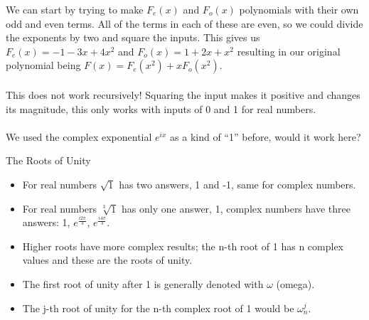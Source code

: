 \documentclass{beamer}
\begin{document}
\begin{frame}
  We can start by trying to make $F_e(x)$ and $F_o(x)$ polynomials with their own odd and even terms. All of the terms in each of these are even, so we could divide the exponents by two and square the inputs. This gives us $F_e(x)=-1-3x+4x^2$ and $F_o(x)=1+2x+x^2$ resulting in our original polynomial being $F(x) = F_e(x^2) + x F_o(x^2)$.\\~\\

  This does not work recursively! Squaring the input makes it positive and changes its magnitude, this only works with inputs of 0 and 1 for real numbers.\\~\\

  We used the complex exponential $e^{ix}$ as a kind of ``1'' before, would it work here?
\end{frame}

\begin{frame}{The Roots of Unity}
  \rootsOfUnity[0.6\textwidth]
\end{frame}

\begin{frame}
  \begin{itemize}
    \item For real numbers $\sqrt{1}$ has two answers, 1 and -1, same for complex numbers.
    \item For real numbers $\sqrt[3]{1}$ has only one answer, 1, complex numbers have three answers: 1, $e^\frac{i2\pi}{3}$, $e^\frac{i4\pi}{3}$.
    \item Higher roots have more complex results; the n-th root of 1 has n complex values and these are the roots of unity.
    \item The first root of unity after 1 is generally denoted with $\omega$ (omega).
    \item The j-th root of unity for the n-th complex root of 1 would be $\omega_n^j$.
  \end{itemize}

\end{frame}
\end{document}
